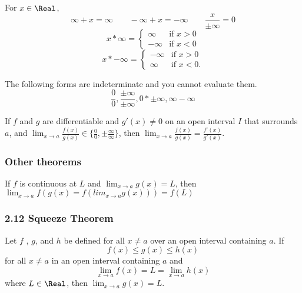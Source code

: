 \begin{theorem}
  For $x \in \Real$,
  \[
    \infty + x = \infty \qquad
    -\infty + x = -\infty \qquad
    \frac{x}{\pm\infty} = 0 
  \]\[
    x * \infty = \begin{cases}
      \infty & \text{if } x > 0 \\
      -\infty & \text{if } x < 0
    \end{cases}
  \]\[
    x * -\infty = \begin{cases}
      -\infty & \text{if } x > 0 \\
      \infty & \text{if } x < 0.
    \end{cases}
  \]
\end{theorem}

\begin{definition}
  The following forms are indeterminate and you cannot evaluate them.
  \[
    \frac{0}{0}, \frac{\pm\infty}{\pm\infty}, 0*\pm\infty, \infty - \infty
  \]
\end{definition}

\begin{theorem}
  If $f$ and $g$ are differentiable and $g'(x) \neq 0$ on an open interval $I$ that surrounds $a$, and $\displaystyle\lim_{x \to a}\frac{f(x)}{g(x)} \in \{\frac{0}{0}, \pm\frac{\infty}{\infty}\}$, then $\displaystyle\lim_{x \to a}\frac{f(x)}{g(x)} = \frac{f'(x)}{g'(x)}$.
\end{theorem}
\subsubsection*{Other theorems}

\begin{namedtheorem}
  If $f$ is continuous at $L$ and $\displaystyle\lim_{x \to a}g(x) = L$, then $\displaystyle\lim_{x \to a} f(g(x) = f(lim_{x \to a} g(x))) = f(L)$
\end{namedtheorem}

\subsubsection*{2.12 Squeeze Theorem}

\begin{namedtheorem}
  Let $f$ , $g$, and $h$ be defined for all $x \neq a$ over an open interval containing $a$. If
  $$
    f(x) \leq g(x) \leq h(x)
  $$
  for all $x \neq a$ in an open interval containing $a$ and
  $$
  \lim_{x \to a} f (x) = L = \lim_{x \to a} h(x)
  $$
  where $L \in \Real$, then $\lim_{x \to a} g(x) = L$.
\end{namedtheorem}

